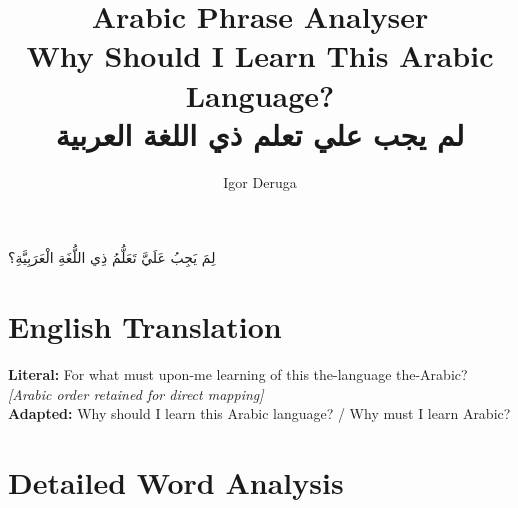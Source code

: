 \documentclass[letterpaper,12pt]{article}
\begin{document}
\title{\textbf{\Large Arabic Phrase Analyser}\\
\large Why Should I Learn This Arabic Language?\\
\normalsize \textarabic{لم يجب علي تعلم ذي اللغة العربية}}
\author{Igor Deruga}
\date{}
\maketitle

\begin{tcolorbox}[colback=boxcolor,colframe=headercolor,title=\textbf{Arabic Phrase with Full Diacritics},breakable]
\centering
\Large\textarabic{لِمَ يَجِبُ عَلَيَّ تَعَلُّمُ ذِي اللُّغَةِ الْعَرَبِيَّةِ؟}
\end{tcolorbox}

\section{English Translation}
\begin{tcolorbox}[colback=white,colframe=accentcolor,breakable]
\textbf{Literal:} For what must upon-me learning of this the-language the-Arabic? \\
\textit{[Arabic order retained for direct mapping]}\\[0.5em]
\textbf{Adapted:} Why should I learn this Arabic language? / Why must I learn Arabic?
\end{tcolorbox}

\section{Detailed Word Analysis}
\end{document}
